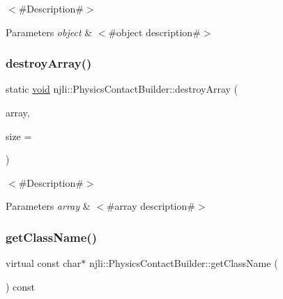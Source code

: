 $<$\#\+Description\#$>$


\begin{DoxyParams}{Parameters}
{\em object} & $<$\#object description\#$>$ \\
\hline
\end{DoxyParams}
\mbox{\label{classnjli_1_1_physics_contact_builder_aed09aa4931074cf0ee141355e397fabd}} 
\subsubsection{\texorpdfstring{destroy\+Array()}{destroyArray()}}
{\footnotesize\ttfamily static \mbox{\hyperlink{_thread_8h_af1e856da2e658414cb2456cb6f7ebc66}{void}} njli\+::\+Physics\+Contact\+Builder\+::destroy\+Array (\begin{DoxyParamCaption}\item[{\mbox{\hyperlink{classnjli_1_1_physics_contact_builder}{Physics\+Contact\+Builder}} $\ast$$\ast$}]{array,  }\item[{const \mbox{\hyperlink{_util_8h_a10e94b422ef0c20dcdec20d31a1f5049}{u32}}}]{size = {} }\end{DoxyParamCaption})\hspace{0.3cm}{\ttfamily [static]}}

$<$\#\+Description\#$>$


\begin{DoxyParams}{Parameters}
{\em array} & $<$\#array description\#$>$ \\
\hline
\end{DoxyParams}
\mbox{\label{classnjli_1_1_physics_contact_builder_a724051c3657dcc9d6982b3f20b60e7ea}} 
\subsubsection{\texorpdfstring{get\+Class\+Name()}{getClassName()}}
{\footnotesize\ttfamily virtual const char$\ast$ njli\+::\+Physics\+Contact\+Builder\+::get\+Class\+Name (\begin{DoxyParamCaption}{ }\end{DoxyParamCaption}) const\hspace{0.3cm}{\ttfamily [virtual]}}

